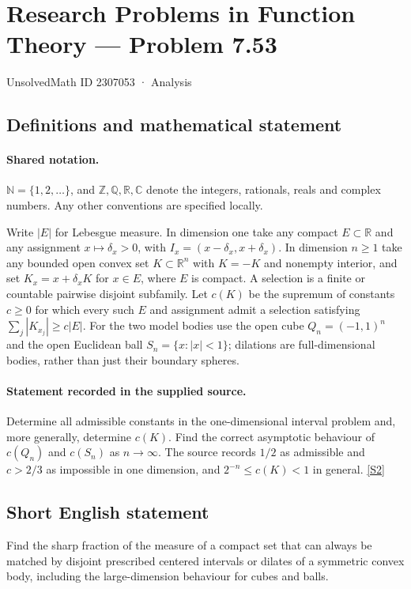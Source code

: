 \documentclass[11pt]{article}
\newcommand{\sref}[2]{\hyperlink{source:#1:#2}{[S#2]}}
\begin{document}
\setcounter{section}{2307052}
\section{Research Problems in Function Theory — Problem 7.53}\label{2307053}
{\small\sffamily UnsolvedMath ID 2307053 · Analysis}
\subsection{Definitions and mathematical statement}

\paragraph{Shared notation.}$\mathbb N=\{1,2,\ldots\}$, and $\mathbb Z,\mathbb Q,\mathbb R,\mathbb C$ denote the integers, rationals, reals and complex numbers. Any other conventions are specified locally.


Write $|E|$ for Lebesgue measure. In dimension one take any compact $E\subset\mathbb R$ and any assignment $x\mapsto\delta_x>0$, with $I_x=(x-\delta_x,x+\delta_x)$. In dimension $n\ge1$ take any bounded open convex set $K\subset\mathbb R^n$ with $K=-K$ and nonempty interior, and set $K_x=x+\delta_xK$ for $x\in E$, where $E$ is compact. A selection is a finite or countable pairwise disjoint subfamily. Let $c(K)$ be the supremum of constants $c\ge0$ for which every such $E$ and assignment admit a selection satisfying $\sum_j|K_{x_j}|\ge c|E|$. For the two model bodies use the open cube $Q_n=(-1,1)^n$ and the open Euclidean ball $S_n=\{x:|x|<1\}$; dilations are full-dimensional bodies, rather than just their boundary spheres.
\paragraph{Statement recorded in the supplied source.}
Determine all admissible constants in the one-dimensional interval problem and, more generally, determine $c(K)$. Find the correct asymptotic behaviour of $c(Q_n)$ and $c(S_n)$ as $n\to\infty$. The source records $1/2$ as admissible and $c>2/3$ as impossible in one dimension, and $2^{-n}\le c(K)<1$ in general. \sref{2307053}{2}
\subsection{Short English statement}
Find the sharp fraction of the measure of a compact set that can always be matched by disjoint prescribed centered intervals or dilates of a symmetric convex body, including the large-dimension behaviour for cubes and balls.
\end{document}
